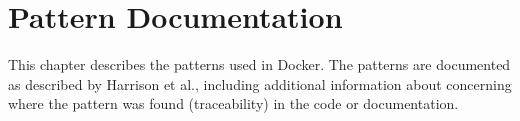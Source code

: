 
\clearpage

\chapter{Pattern Documentation}
\label{ch:patterns}
This chapter describes the patterns used in Docker. The patterns are documented as described by Harrison et al.\cite{usingpatternscapture}, including additional information about concerning where the pattern was found (traceability) in the code or documentation.

